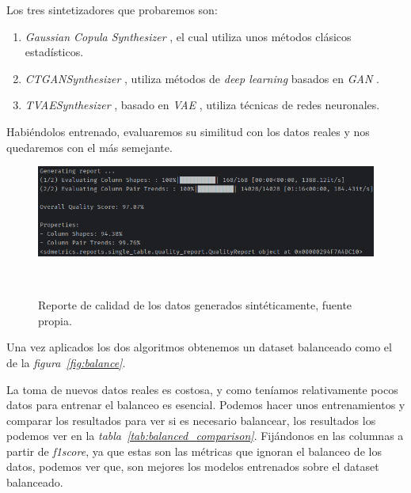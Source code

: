 Los tres sintetizadores que probaremos son:

\begin{enumerate}
    \item \textit{Gaussian Copula Synthesizer} \cite{Gaussian4:online}, el cual utiliza unos métodos clásicos estadísticos.
    \item \textit{CTGANSynthesizer} \cite{CTGANSyn50:online}, utiliza métodos de \textit{deep learning} basados en \textit{GAN} \cite{Generati72:online}.
    \item \textit{TVAESynthesizer} \cite{TVAESynt0:online}, basado en \textit{VAE} \cite{Variatio61:online}, utiliza técnicas de redes neuronales.
\end{enumerate}

Habiéndolos entrenado, evaluaremos su similitud con los datos reales y nos quedaremos con el más semejante.


\begin{figure}[!ht]
    \centering
    \includegraphics[width=0.8\linewidth]{media/images/quality_report.png}
    \caption{Reporte de calidad de los datos generados sintéticamente, fuente propia.}\ \label{fig:quality_report}
\end{figure}

Una vez aplicados los dos algoritmos obtenemos un \gls{dataset} balanceado como el de la \textit{figura\ \ref{fig:balance}}.

La toma de nuevos datos reales es costosa, y como teníamos relativamente pocos datos para entrenar el balanceo es esencial. Podemos hacer unos entrenamientos y comparar los resultados para ver si es necesario 
balancear, los resultados los podemos ver en la \textit{tabla\ \ref{tab:balanced_comparison}}. Fijándonos en las columnas a partir de \textit{f1score}, ya que estas son las métricas que ignoran el balanceo de 
los datos, podemos ver que, son mejores los modelos entrenados sobre el \gls{dataset} balanceado.

